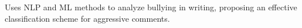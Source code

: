 Uses NLP and ML methods to analyze bullying in writing, proposing an effective classification scheme for aggressive comments.